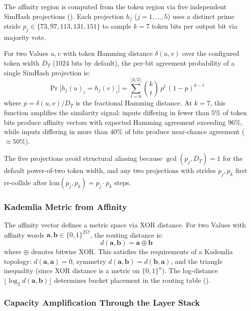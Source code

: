 The affinity region is computed from the token region via five
independent SimHash projections ().  Each
projection $h_j$ ($j = 1, \ldots, 5$) uses a distinct prime stride
$p_j \in \{73, 97, 113, 131, 151\}$ to sample $k = 7$ token bits per
output bit via majority vote.

For two Values $u, v$ with token Hamming distance $\delta(u,v)$ over
the configured token width $D_T$ (1024 bits by default), the per-bit
agreement probability of a single SimHash
projection is:
\begin{equation}
  \Pr\bigl[h_j(u)_i = h_j(v)_i\bigr]
    = \sum_{t=0}^{\lfloor k/2 \rfloor} \binom{k}{t}\, p^t\, (1-p)^{k-t}
  \label{eq:simhash_agreement}
\end{equation}
where $p = \delta(u,v) / D_T$ is the fractional Hamming distance.  At
$k=7$, this function amplifies the similarity signal: inputs differing
in fewer than $5\%$ of token bits produce affinity vectors with expected
Hamming agreement exceeding $96\%$, while inputs differing in more than
$40\%$ of bits produce near-chance agreement ($\approx 50\%$).

The five projections avoid structural aliasing because
$\gcd(p_j, D_T) = 1$ for the default power-of-two token width, and any
two projections with strides $p_j, p_k$ first re-collide after
$\text{lcm}(p_j, p_k) = p_j \cdot p_k$ steps.

\subsubsection{Kademlia Metric from Affinity}

The affinity vector defines a metric space via XOR distance.  For two
Values with affinity words $\mathbf{a}, \mathbf{b} \in \{0,1\}^{257}$,
the routing distance is:
\begin{equation}
  d(\mathbf{a}, \mathbf{b})
    = \mathbf{a} \oplus \mathbf{b}
  \label{eq:xor_distance}
\end{equation}
where $\oplus$ denotes bitwise XOR.  This satisfies the requirements of
a Kademlia topology: $d(\mathbf{a}, \mathbf{a}) = 0$, symmetry
$d(\mathbf{a}, \mathbf{b}) = d(\mathbf{b}, \mathbf{a})$, and the
triangle inequality (since XOR distance is a metric on $\{0,1\}^n$).
The log-distance $\lfloor \log_2 d(\mathbf{a}, \mathbf{b}) \rfloor$
determines bucket placement in the routing table
().

\subsubsection{Capacity Amplification Through the Layer Stack}


